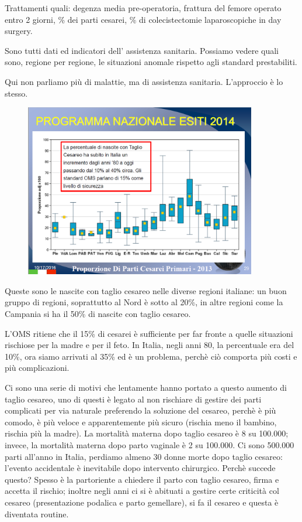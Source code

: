 Trattamenti quali: degenza media pre-operatoria, frattura del femore
operato entro 2 giorni, \% dei parti cesarei, \% di colecistectomie
laparoscopiche in day surgery.

Sono tutti dati ed indicatori dell' assistenza sanitaria. Possiamo
vedere quali sono, regione per regione, le situazioni anomale rispetto
agli standard prestabiliti.

Qui non parliamo più di malattie, ma di assistenza sanitaria.
L'approccio è lo stesso.

\begin{figure}[!ht]
\centering
	\includegraphics[width=0.9\textwidth]{02/image7.png}
\end{figure}


Queste sono le nascite con taglio cesareo nelle diverse regioni
italiane: un buon gruppo di regioni, soprattutto al Nord è sotto al
20\%, in altre regioni come la Campania si ha il 50\% di nascite con
taglio cesareo.

L'OMS ritiene che il 15\% di cesarei è sufficiente per far fronte a
quelle situazioni rischiose per la madre e per il feto. In Italia, negli
anni 80, la percentuale era del 10\%, ora siamo arrivati al 35\% ed è un
problema, perchè ciò comporta più costi e più complicazioni.

Ci sono una serie di motivi che lentamente hanno portato a questo
aumento di taglio cesareo, uno di questi è legato al non rischiare di
gestire dei parti complicati per via naturale preferendo la soluzione
del cesareo, perchè è più comodo, è più veloce e apparentemente più
sicuro (rischia meno il bambino, rischia più la madre). La mortalità
materna dopo taglio cesareo è 8 su 100.000; invece, la mortalità materna
dopo parto vaginale è 2 su 100.000. Ci sono 500.000 parti all'anno in
Italia, perdiamo almeno 30 donne morte dopo taglio cesareo: l'evento
accidentale è inevitabile dopo intervento chirurgico. Perchè succede
questo? Spesso è la partoriente a chiedere il parto con taglio cesareo,
firma e accetta il rischio; inoltre negli anni ci si è abituati a
gestire certe criticità col cesareo (presentazione podalica e parto
gemellare), si fa il cesareo e questa è diventata routine.

